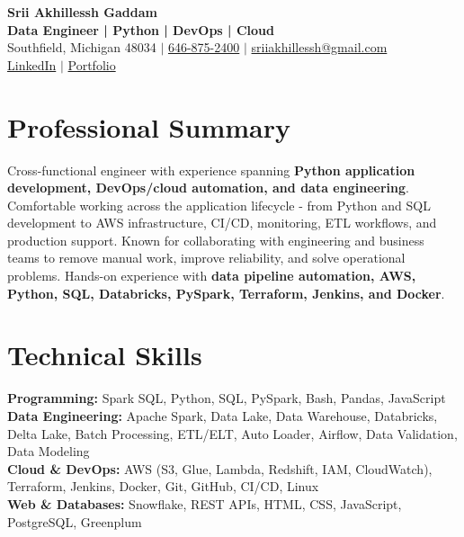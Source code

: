 \documentclass[letterpaper,10pt]{article}
\begin{document}
\fontsize{9.35pt}{10.45pt}\selectfont

\begin{center}
    {\LARGE \textbf{Srii Akhillessh Gaddam}} \\[-1pt]
    \textbf{Data Engineer | Python | DevOps | Cloud} \\[2pt]
    Southfield, Michigan 48034 $|$
    \href{tel:6468752400}{646-875-2400} $|$
    \href{mailto:sriiakhillessh@gmail.com}{sriiakhillessh@gmail.com} \\[1pt]
    \href{https://www.linkedin.com/in/srii-akhiilessh-gaddam-b48668191/}{LinkedIn} $|$
    \href{https://sriiakhillesshg.github.io/portfolio/}{Portfolio}
\end{center}
\vspace{-8pt}

\section{Professional Summary}
\small{Cross-functional engineer with experience spanning \textbf{Python application development, DevOps/cloud automation, and data engineering}. Comfortable working across the application lifecycle - from Python and SQL development to AWS infrastructure, CI/CD, monitoring, ETL workflows, and production support. Known for collaborating with engineering and business teams to remove manual work, improve reliability, and solve operational problems. Hands-on experience with \textbf{data pipeline automation, AWS, Python, SQL, Databricks, PySpark, Terraform, Jenkins, and Docker}.}

\section{Technical Skills}
\small{
\textbf{Programming:} Spark SQL, Python, SQL, PySpark, Bash, Pandas, JavaScript \\
\textbf{Data Engineering:} Apache Spark, Data Lake, Data Warehouse, Databricks, Delta Lake, Batch Processing, ETL/ELT, Auto Loader, Airflow, Data Validation, Data Modeling \\
\textbf{Cloud \& DevOps:} AWS (S3, Glue, Lambda, Redshift, IAM, CloudWatch), Terraform, Jenkins, Docker, Git, GitHub, CI/CD, Linux \\
\textbf{Web \& Databases:} Snowflake, REST APIs, HTML, CSS, JavaScript, PostgreSQL, Greenplum
}
\end{document}
